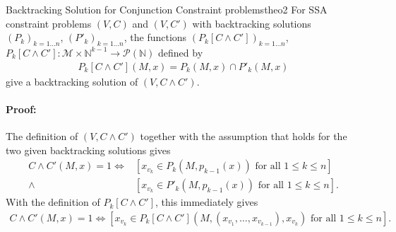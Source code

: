 \begin{theorem}{Backtracking Solution for Conjunction Constraint problems}{theo2}
    For SSA constraint problems $(V,C)$ and $(V,C')$ with backtracking
    solutions $(P_k)_{k=1\dots n}$, $(P'_k)_{k=1\dots n}$, the
    functions $(P_k[C\mathrel\land C'])_{k=1\dots n}$,
    $P_k[C\mathrel\land C']\colon\mathcal M\times\mathbb N^{k-1}\rightarrow\mathcal P(\mathbb N)$
    defined by
    \begin{align*}
        P_k[C\mathrel\land C'](M,x)=P_k(M,x)\mathrel\cap P'_k(M,x)
    \end{align*}
    give a backtracking solution of $(V,C\mathrel\land C')$.
    \tcblower
    \paragraph*{Proof:}
    The definition of $(V,C\mathrel\land C')$ together with the
    assumption that  holds for the two given
    backtracking solutions gives
    \begin{align*}
        C\mathrel\land C'(M,x)=1\iff{}&\left[x_{v_k}\in P_k(M,p_{k-1}(x))\text{ for all }1\leq k\leq n\right]\\
                              \mathrel\land{}&\left[x_{v_k}\in P'_k(M,p_{k-1}(x))\text{ for all }1\leq k\leq n\right].
    \end{align*}
    With the definition of $P_k[C\mathrel\land C']$, this immediately gives
    \begin{align*}
        C\mathrel\land C'(M,x)=1\iff\left[x_{v_k}\in P_k[C\mathrel\land C'](M,(x_{v_1},\dots,x_{v_{k-1}}),x_{v_k})\text{ for all }1\leq k\leq n\right].
    \end{align*}
\end{theorem}
